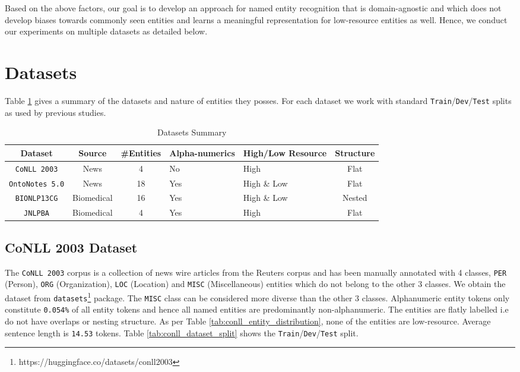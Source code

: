 Based on the above factors, our goal is to develop an approach for named entity recognition that is domain-agnostic and which does not develop biases towards commonly seen entities and learns a meaningful representation for low-resource entities as well. Hence, we conduct our experiments on multiple datasets as detailed below. 

\section{Datasets}

Table \ref{tab:datasets_summary} gives a summary of the datasets and nature of entities they posses. For each dataset we work with standard \texttt{Train}/\texttt{Dev}/\texttt{Test} splits as used by previous studies.

\begin{table}[h!]
	\begin{tabular}{|c|c|c|p{5em}|p{6em}|c|}\hline
	\textbf{Dataset} & \textbf{Source} & \textbf{\#Entities} & \textbf{Alpha-numerics} & \textbf{High/Low Resource} & \textbf{Structure}\\\hline
	\texttt{CoNLL 2003} & News & 4 & No & High & Flat\\\hline
	\texttt{OntoNotes 5.0} & News & 18 & Yes & High \& Low & Flat\\\hline
	\texttt{BIONLP13CG} & Biomedical & 16 & Yes & High \& Low & Nested\\\hline
	\texttt{JNLPBA} & Biomedical & 4 & Yes & High & Flat\\\hline
	\end{tabular}
	\caption{Datasets Summary}
	\label{tab:datasets_summary}
\end{table}

\subsection{CoNLL 2003 Dataset}

The \texttt{CoNLL 2003}\cite{sang2003introduction} corpus is a collection of news wire articles from the Reuters corpus and has been manually annotated with 4 classes, \texttt{PER} (Person), \texttt{ORG} (Organization), \texttt{LOC} (Location) and \texttt{MISC} (Miscellaneous) entities which do not belong to the other 3 classes. We obtain the dataset from \texttt{datasets}\footnote{https://huggingface.co/datasets/conll2003} package. The \texttt{MISC} class can be considered more diverse than the other 3 classes. Alphanumeric entity tokens only constitute \texttt{0.054\%} of all entity tokens and hence all named entities are predominantly non-alphanumeric. The entities are flatly labelled i.e do not have overlaps or nesting structure. As per Table \ref{tab:conll_entity_distribution}, none of the entities are low-resource. Average sentence length is \texttt{14.53} tokens. Table \ref{tab:conll_dataset_split} shows the \texttt{Train}/\texttt{Dev}/\texttt{Test} split. 

